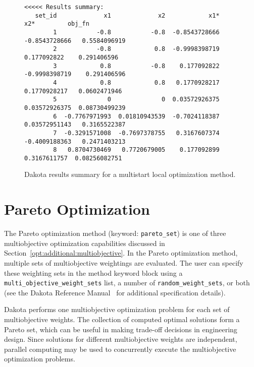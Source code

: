 \begin{figure}
\centering
\begin{bigbox}
\begin{footnotesize}
\begin{verbatim}
<<<<< Results summary:
   set_id             x1             x2            x1*            x2*         obj_fn 
        1           -0.8           -0.8  -0.8543728666  -0.8543728666   0.5584096919 
        2           -0.8            0.8  -0.9998398719    0.177092822    0.291406596 
        3            0.8           -0.8    0.177092822  -0.9998398719    0.291406596 
        4            0.8            0.8   0.1770928217   0.1770928217   0.0602471946 
        5              0              0  0.03572926375  0.03572926375  0.08730499239 
        6  -0.7767971993  0.01810943539  -0.7024118387  0.03572951143   0.3165522387 
        7  -0.3291571008  -0.7697378755   0.3167607374  -0.4009188363   0.2471403213 
        8   0.8704730469   0.7720679005    0.177092899   0.3167611757  0.08256082751 
\end{verbatim}
\end{footnotesize}
\end{bigbox}
\caption{Dakota results summary for a multistart local optimization method.}
\label{adv_meth:figure03}
\end{figure}

\section{Pareto Optimization}\label{adv_meth:pareto}

The Pareto optimization method (keyword: \texttt{pareto\_set}) is
one of three multiobjective optimization capabilities discussed in
Section~\ref{opt:additional:multiobjective}. In the Pareto
optimization method, multiple sets of multiobjective weightings are
evaluated. The user can specify these weighting sets in the method
keyword block using a \texttt{multi\_objective\_weight\_sets} list, a
number of \texttt{random\_weight\_sets}, or both (see the Dakota
Reference Manual~\cite{RefMan} for additional specification details).

Dakota performs one multiobjective optimization problem for each set
of multiobjective weights. The collection of computed optimal
solutions form a Pareto set, which can be useful in making trade-off
decisions in engineering design. Since solutions for different
multiobjective weights are independent, parallel computing may be used
to concurrently execute the multiobjective optimization problems.

